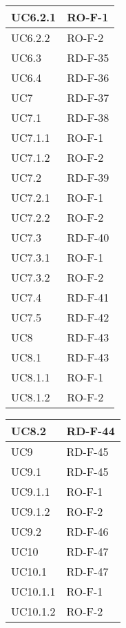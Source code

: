 \begin{center}
\begin{tabular}{ |m{8em}|m{13em}| }
    \hline
    UC6.2.1     &   RO-F-1 \\
    \hline
    UC6.2.2     &   RO-F-2 \\
    \hline
    UC6.3       &   RD-F-35 \\
    \hline
    UC6.4       &   RD-F-36 \\
    \hline
    UC7         &   RD-F-37 \\
    \hline
    UC7.1       &   RD-F-38 \\
    \hline
    UC7.1.1     &   RO-F-1 \\
    \hline
    UC7.1.2     &   RO-F-2 \\
    \hline
    UC7.2       &   RD-F-39 \\
    \hline
    UC7.2.1     &   RO-F-1 \\
    \hline
    UC7.2.2     &   RO-F-2 \\
    \hline
    UC7.3       &   RD-F-40 \\
    \hline
    UC7.3.1     &   RO-F-1 \\
    \hline
    UC7.3.2     &   RO-F-2 \\
    \hline
    UC7.4       &   RD-F-41 \\
    \hline
    UC7.5       &   RD-F-42 \\
    \hline
    UC8         &   RD-F-43 \\
    \hline
    UC8.1       &   RD-F-43 \\
    \hline
    UC8.1.1     &   RO-F-1 \\
    \hline
    UC8.1.2     &   RO-F-2 \\
    \hline
    \end{tabular}
    \newpage
    \begin{tabular}{ |m{8em}|m{13em}| }
    \hline
    UC8.2       &   RD-F-44 \\
    \hline
    UC9         &   RD-F-45 \\
    \hline
    UC9.1       &   RD-F-45 \\
    \hline
    UC9.1.1     &   RO-F-1 \\
    \hline
    UC9.1.2     &   RO-F-2 \\
    \hline
    UC9.2       &   RD-F-46 \\
    \hline
    UC10        &   RD-F-47 \\
    \hline
    UC10.1      &   RD-F-47 \\
    \hline
    UC10.1.1    &   RO-F-1 \\
    \hline
    UC10.1.2    &   RO-F-2 \\

\end{tabular}
\end{center}
